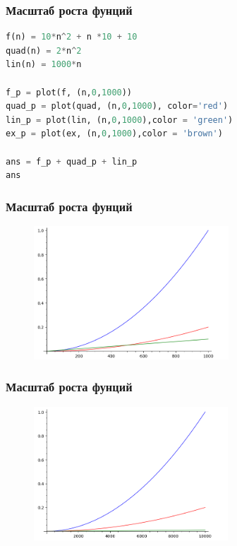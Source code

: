 \documentclass[russian, 12pt]{beamer}
\begin{document}
\begin{frame}[fragile]
\frametitle{Масштаб роста фунций}
\begin{lstlisting}[language=Python]
f(n) = 10*n^2 + n *10 + 10
quad(n) = 2*n^2
lin(n) = 1000*n

f_p = plot(f, (n,0,1000))
quad_p = plot(quad, (n,0,1000), color='red')
lin_p = plot(lin, (n,0,1000),color = 'green')
ex_p = plot(ex, (n,0,1000),color = 'brown')

ans = f_p + quad_p + lin_p
ans
\end{lstlisting}
\end{frame}
\begin{frame}
\frametitle{Масштаб роста фунций}
\begin{figure}
\includegraphics[width=\linewidth, height=5cm]{img/complexity_4.png}
\end{figure}
\end{frame}
\begin{frame}
\frametitle{Масштаб роста фунций}
\begin{figure}
  \includegraphics[width=\linewidth, height=5cm]{img/complexity_5.png}
\end{figure}
\end{frame}
\end{document}
